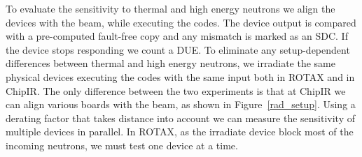 %

To evaluate the sensitivity to thermal and high energy neutrons we align the devices with the beam, while executing the codes. The device output is compared with a pre-computed fault-free copy and any mismatch is marked as an SDC. If the device stops responding we count a DUE.  To eliminate any setup-dependent differences between thermal and high energy neutrons, we irradiate the same physical devices executing the codes with the same input both in ROTAX and in ChipIR. The only difference between the two experiments is that at ChipIR we can align various boards with the beam, as shown in Figure~\ref{rad_setup}. Using a derating factor that takes distance into account we can measure the sensitivity of multiple devices in parallel. In ROTAX, as the irradiate device block most of the incoming neutrons, we must test one device at a time.


